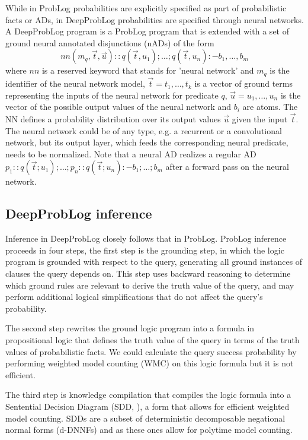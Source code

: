 While in ProbLog probabilities are explicitly specified as part of probabilistic facts or ADs, in DeepProbLog probabilities are specified through neural networks.
A DeepProbLog program is a ProbLog program that is extended with a set of ground neural annotated disjunctions (nADs) of the form
\begin{equation}
    nn(m_q, \vec{t}, \vec{u}) :: q(\vec{t}, u_1); \dots; q(\vec{t}, u_n) :- b_1, \dots, b_m
\end{equation}
where $nn$ is a reserved keyword that stands for 'neural network' and $m_q$ is the identifier of the neural network model, $\vec{t} = t_1, \dots, t_k$ is a vector of ground terms representing the inputs of the neural network for predicate $q$, $\vec{u} = u_1, \dots, u_n$ is the vector of the possible output values of the neural network and $b_i$ are atoms. The NN defines a probability distribution over its output values $\vec{u}$ given the input $\vec{t}$.
The neural network could be of any type, e.g. a recurrent or a convolutional network, but its output layer, which feeds the corresponding neural predicate, needs to be normalized.
Note that a neural AD realizes a regular AD $p_1 :: q(\vec{t}; u_1); \dots; p_n :: q(\vec{t}; u_n) :- b_1; \dots; b_m$ after a forward pass on the neural network.

\subsection{DeepProbLog inference}
Inference in DeepProbLog closely follows that in ProbLog. ProbLog inference proceeds in four steps, the first step is the grounding step, in which the logic program is grounded with respect to the query, generating all ground instances of clauses the query depends on. This step uses backward reasoning to determine which ground rules are relevant to derive the truth value of the query, and may perform additional logical simplifications that do not affect the query's probability.

The second step rewrites the ground logic program into a formula in propositional logic that defines the truth value of the query in terms of the truth values of probabilistic facts. We could calculate the query success probability by performing weighted model counting (WMC) on this logic formula but it is not efficient.

The third step is knowledge compilation that compiles the logic formula into a Sentential Decision Diagram (SDD, \cite{SDD_Darwiche}), a form that allows for efficient weighted model counting. SDDs are a subset of deterministic decomposable negational normal forms (d-DNNFs) and as these ones allow for polytime model counting.

